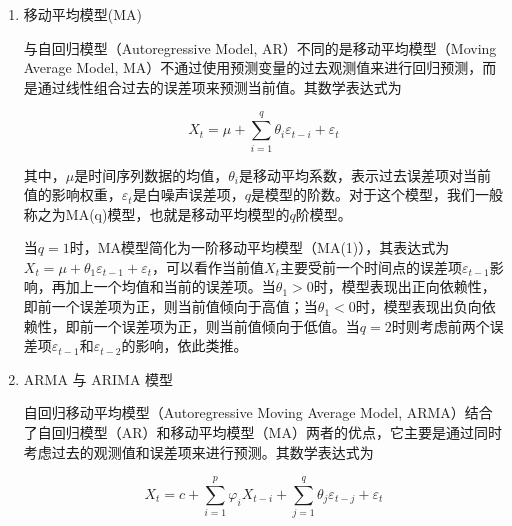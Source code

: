 \begin{enumerate}[label=（\arabic*）, leftmargin=0pt, itemindent=4.5em, labelsep=0.5em, listparindent=2em, parsep=0pt,]
    其中，$X_t$表示时间序列在时间点t的值，$c$是常数项，$\varphi_i$是自回归系数，他们表示过去观测值对当前值的影响权重，$\varepsilon_t$是白噪声误差项，$p$是模型的阶数。

    当$p=1$时，AR模型简化为一阶自回归模型（AR(1)），其表达式为$X_t=c+\varphi_1 X_{t-1}+\varepsilon_t$，可以看作当前值$X_t$主要受前一个时间点$X_{t-1}$的观测值影响，再加上一个常数和一些随机白噪声。当$\varphi_1>0$时，模型表现出正向依赖性，即上一个时刻是高值，则当前值也倾向于高值；当$\varphi_1<0$时，模型表现出负向依赖性，即上一个时刻是高值，则当前值倾向于低值。当$p=2$时则考虑前两个时间点$X_{t-1}$和$X_{t-2}$的影响，依此类推。

    \item 移动平均模型(MA)
    
    与自回归模型（Autoregressive Model, AR）不同的是移动平均模型（Moving Average Model, MA）不通过使用预测变量的过去观测值来进行回归预测，而是通过线性组合过去的误差项来预测当前值。其数学表达式为

    \begin{equation}
        X_t = \mu + \sum_{i=1}^{q} \theta_i \varepsilon_{t-i} + \varepsilon_t
    \end{equation}

    其中，$\mu$是时间序列数据的均值，$\theta_i$是移动平均系数，表示过去误差项对当前值的影响权重，$\varepsilon_t$是白噪声误差项，$q$是模型的阶数。对于这个模型，我们一般称之为MA(q)模型，也就是移动平均模型的$q$阶模型。

    当$q=1$时，MA模型简化为一阶移动平均模型（MA(1)），其表达式为$X_t = \mu + \theta_1 \varepsilon_{t-1} + \varepsilon_t$，可以看作当前值$X_t$主要受前一个时间点的误差项$\varepsilon_{t-1}$影响，再加上一个均值和当前的误差项。当$\theta_1>0$时，模型表现出正向依赖性，即前一个误差项为正，则当前值倾向于高值；当$\theta_1<0$时，模型表现出负向依赖性，即前一个误差项为正，则当前值倾向于低值。当$q=2$时则考虑前两个误差项$\varepsilon_{t-1}$和$\varepsilon_{t-2}$的影响，依此类推。

    \item ARMA 与 ARIMA 模型
    
    自回归移动平均模型（Autoregressive Moving Average Model, ARMA）结合了自回归模型（AR）和移动平均模型（MA）两者的优点，它主要是通过同时考虑过去的观测值和误差项来进行预测。其数学表达式为

    \begin{equation}
        X_t = c + \sum_{i=1}^{p} \varphi_i X_{t-i} + \sum_{j=1}^{q} \theta_j \varepsilon_{t-j} + \varepsilon_t
    \end{equation}


\end{enumerate}
